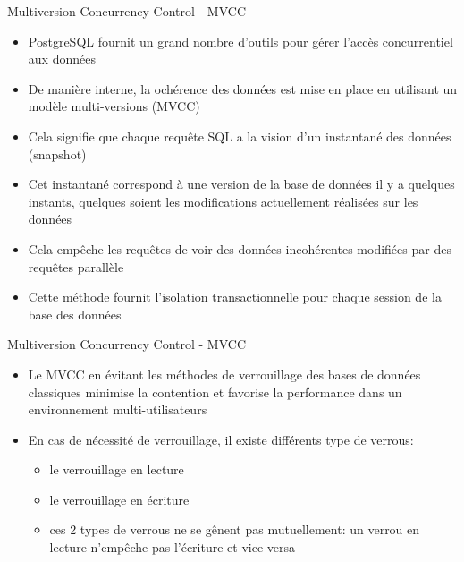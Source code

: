 \begin{frame}{Multiversion Concurrency Control - MVCC}

   \begin{itemize}
      \item PostgreSQL fournit un grand nombre d'outils pour gérer l'accès concurrentiel aux données
      \item De manière interne, la ochérence des données est mise en place en utilisant un modèle multi-versions (MVCC)
      \item Cela signifie que chaque requête SQL a la vision d'un instantané des données (snapshot)
      \item Cet instantané correspond à une version de la base de données il y a quelques instants, quelques soient les modifications actuellement réalisées sur les données
      \item Cela empêche les requêtes de voir des données incohérentes modifiées par des requêtes parallèle
      \item Cette méthode fournit l'isolation transactionnelle pour chaque session de la base des données
   \end{itemize}

\begin{toile}
\end{toile}

\end{frame}


\begin{frame}{Multiversion Concurrency Control - MVCC}

   \begin{itemize}
      \item Le MVCC en évitant les méthodes de verrouillage des bases de données classiques minimise la contention et favorise la performance dans un environnement multi-utilisateurs
      \item En cas de nécessité de verrouillage, il existe différents type de verrous:
      \begin{itemize}
         \item le verrouillage en lecture
         \item le verrouillage en écriture
         \item ces 2 types de verrous ne se gênent pas mutuellement: un verrou en lecture n'empêche pas l'écriture et vice-versa 
      \end{itemize}
   \end{itemize}

\end{frame}

